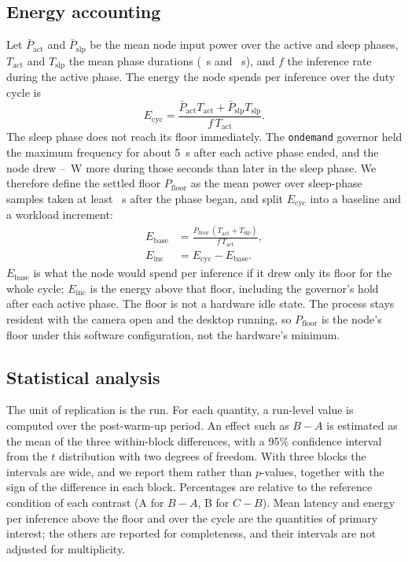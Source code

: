 \documentclass[10pt,journal,compsoc]{IEEEtran}
\begin{document}
\subsection{Energy accounting}\label{sec:energy}
Let $\bar P_{\mathrm{act}}$ and $\bar P_{\mathrm{slp}}$ be the mean node input power over the active and sleep phases, $T_{\mathrm{act}}$ and $T_{\mathrm{slp}}$ the mean phase durations (\TActS~s and \TSlpS~s), and $f$ the inference rate during the active phase. The energy the node spends per inference over the duty cycle is
\begin{equation}
E_{\mathrm{cyc}} = \frac{\bar P_{\mathrm{act}}T_{\mathrm{act}}+\bar P_{\mathrm{slp}}T_{\mathrm{slp}}}{f\,T_{\mathrm{act}}}. \label{eq:cyc}
\end{equation}
The sleep phase does not reach its floor immediately. The \texttt{ondemand} governor held the maximum frequency for about 5~s after each active phase ended, and the node drew \HoldWlo--\HoldWhi~W more during those seconds than later in the sleep phase. We therefore define the settled floor $P_{\mathrm{floor}}$ as the mean power over sleep-phase samples taken at least \SettleS~s after the phase began, and split $E_{\mathrm{cyc}}$ into a baseline and a workload increment:
\begin{align}
E_{\mathrm{base}} &= \frac{P_{\mathrm{floor}}\,(T_{\mathrm{act}}+T_{\mathrm{slp}})}{f\,T_{\mathrm{act}}}, \label{eq:base}\\
E_{\mathrm{inc}} &= E_{\mathrm{cyc}} - E_{\mathrm{base}}. \label{eq:inc}
\end{align}
$E_{\mathrm{base}}$ is what the node would spend per inference if it drew only its floor for the whole cycle; $E_{\mathrm{inc}}$ is the energy above that floor, including the governor's hold after each active phase. The floor is not a hardware idle state. The process stays resident with the camera open and the desktop running, so $P_{\mathrm{floor}}$ is the node's floor under this software configuration, not the hardware's minimum.

\subsection{Statistical analysis}
The unit of replication is the run. For each quantity, a run-level value is computed over the post-warm-up period. An effect such as $B-A$ is estimated as the mean of the three within-block differences, with a 95\% confidence interval from the $t$ distribution with two degrees of freedom. With three blocks the intervals are wide, and we report them rather than $p$-values, together with the sign of the difference in each block. Percentages are relative to the reference condition of each contrast (A for $B-A$, B for $C-B$). Mean latency and energy per inference above the floor and over the cycle are the quantities of primary interest; the others are reported for completeness, and their intervals are not adjusted for multiplicity.
\end{document}
